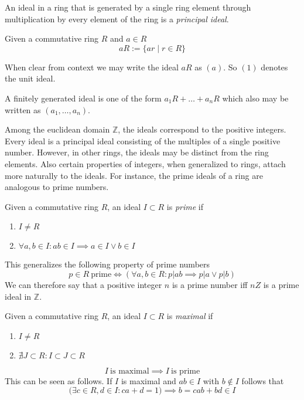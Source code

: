 An ideal in a ring that is generated by a single ring element through multiplication by every element of the ring is a \emph{principal ideal}.
\begin{definition}
   Given a commutative ring \(R\) and \(a \in R\)
   \[aR := \{a r \mid r \in R\}\]
\end{definition}
\begin{remark}[Notation]
   When clear from context we may write the ideal \(aR\) as \((a)\).
   So \((1)\) denotes the unit ideal.

   A finitely generated ideal is one of the form \(a_1R + \ldots + a_nR\) which also may be written as \((a_1, \ldots, a_n)\).
\end{remark}

Among the euclidean domain \(\mathbb{Z}\), the ideals correspond to the positive integers.
Every ideal is a principal ideal consisting of the multiples of a single positive number.
However, in other rings, the ideals may be distinct from the ring elements.
Also certain properties of integers, when generalized to rings, attach more naturally to the ideals.
For instance, the prime ideals of a ring are analogous to prime numbers.

\begin{definition}
   Given a commutative ring \(R\), an ideal \(I \subset R\) is \emph{prime} if
   \begin{enumerate}[label=\roman*, align=Center]
      \item \(I \neq R\)
      \item \(\forall a, b \in I: ab \in I \implies a \in I \lor b \in I\)
   \end{enumerate}
\end{definition}
\begin{remark}
   This generalizes the following property of prime numbers
   \[p \in R~\text{prime} \iff (\forall a,b \in R: p | ab \implies p | a \lor p | b)\]
   We can therefore say that a positive integer \(n\) is a prime number iff \(nZ\) is a prime ideal in \(\mathbb{Z}\).
\end{remark}

\begin{definition}\label{def:max_ideal}
   Given a commutative ring \(R\), an ideal \(I \subset R\) is \emph{maximal} if
   \begin{enumerate}[label=\roman*, align=Center]
      \item \(I \neq R\)
      \item \(\nexists J \subset R: I \subset J \subset R\)
   \end{enumerate}
\end{definition}
\begin{remark}
   \[I~\text{is maximal} \implies I~\text{is prime}\]
   This can be seen as follows.
   If \(I\) is maximal and \(ab \in I\) with \(b \notin I\) follows that
   \[\big(\exists c \in R, d \in I: ca + d = 1\big) \implies b = cab + bd \in I\]
\end{remark}

